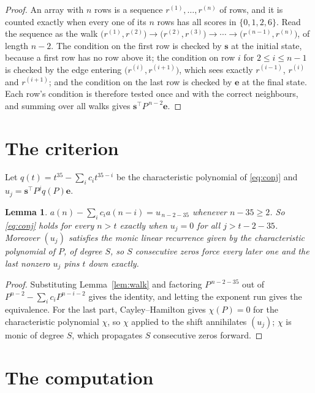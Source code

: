 \documentclass[11pt,a4paper]{article}
\theoremstyle{plain}
\newtheorem{lemma}[theorem]{Lemma}
\theoremstyle{definition}
\begin{document}
\begin{proof}
An array with $n$ rows is a sequence $r^{(1)},\dots,r^{(n)}$ of rows, and it is counted
exactly when every one of its $n$ rows has all scores in $\{0,1,2,6\}$. Read the sequence as the
walk $\bigl(r^{(1)},r^{(2)}\bigr)\to\bigl(r^{(2)},r^{(3)}\bigr)\to\cdots\to
\bigl(r^{(n-1)},r^{(n)}\bigr)$, of length $n-2$. The condition on the first row is
checked by $\mathbf{s}$ at the initial state, because a first row has no row above it; the
condition on row $i$ for $2\le i\le n-1$ is checked by the edge entering
$\bigl(r^{(i)},r^{(i+1)}\bigr)$, which sees exactly $r^{(i-1)}$, $r^{(i)}$ and
$r^{(i+1)}$; and the condition on the last row is checked by $\mathbf{e}$ at the final
state. Each row's condition is therefore tested once and with the correct neighbours, and
summing over all walks gives $\mathbf{s}^{\!\top}P^{\,n-2}\mathbf{e}$.
\end{proof}

\section{The criterion}

Let $q(t)=t^{35}-\sum_i c_i t^{35-i}$ be the characteristic polynomial of
\eqref{eq:conj} and $u_j=\mathbf{s}^{\!\top}P^{j}q(P)\mathbf{e}$.

\begin{lemma}\label{lem:crit}
$a(n)-\sum_i c_i a(n-i)=u_{\,n-2-35}$ whenever $n-35\ge2$. So \eqref{eq:conj}
holds for every $n>t$ exactly when $u_j=0$ for all $j>t-2-35$. Moreover $(u_j)$
satisfies the monic linear recurrence given by the characteristic polynomial of $P$, of
degree $S$, so $S$ consecutive zeros force every later one and the last nonzero $u_j$ pins
$t$ down exactly.
\end{lemma}

\begin{proof}
Substituting Lemma~\ref{lem:walk} and factoring $P^{\,n-2-35}$ out of
$P^{n-2}-\sum_i c_i P^{n-i-2}$ gives the identity, and letting the exponent run gives the
equivalence. For the last part, Cayley--Hamilton gives $\chi(P)=0$ for the characteristic
polynomial $\chi$, so $\chi$ applied to the shift annihilates $(u_j)$; $\chi$ is monic of
degree $S$, which propagates $S$ consecutive zeros forward.
\end{proof}

\section{The computation}
\end{document}
